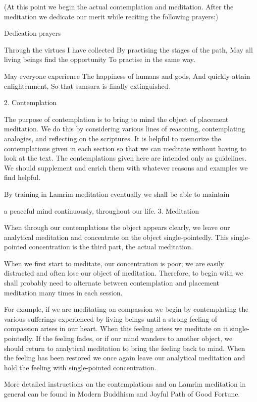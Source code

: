 \documentclass{book}\usepackage[]{graphicx}\usepackage[]{color}
\begin{document}
(At this point we begin the actual contemplation and meditation. After the meditation we dedicate our merit while reciting the following prayers:)

Dedication prayers

Through the virtues I have collected
By practising the stages of the path,
May all living beings find the opportunity
To practise in the same way.

May everyone experience
The happiness of humans and gods,
And quickly attain enlightenment,
So that samsara is finally extinguished.

2. Contemplation

The purpose of contemplation is to bring to mind the object of placement meditation. We do this by considering various lines of reasoning, contemplating analogies, and reflecting on the scriptures. It is helpful to memorize the contemplations given in each section so that we can meditate without having to look at the text. The contemplations given here are intended only as guidelines. We should supplement and enrich them with whatever reasons and examples we find helpful.

By training in Lamrim meditation eventually we shall be able to maintain

a peaceful mind continuously, throughout our life.
3. Meditation

When through our contemplations the object appears clearly, we leave our analytical meditation and concentrate on the object single-pointedly. This single-pointed concentration is the third part, the actual meditation.

When we first start to meditate, our concentration is poor; we are easily distracted and often lose our object of meditation. Therefore, to begin with we shall probably need to alternate between contemplation and placement meditation many times in each session.

For example, if we are meditating on compassion we begin by contemplating the various sufferings experienced by living beings until a strong feeling of compassion arises in our heart. When this feeling arises we meditate on it single-pointedly. If the feeling fades, or if our mind wanders to another object, we should return to analytical meditation to bring the feeling back to mind. When the feeling has been restored we once again leave our analytical meditation and hold the feeling with single-pointed concentration.

More detailed instructions on the contemplations and on Lamrim meditation in general can be found in Modern Buddhism and Joyful Path of Good Fortune.
\end{document}
